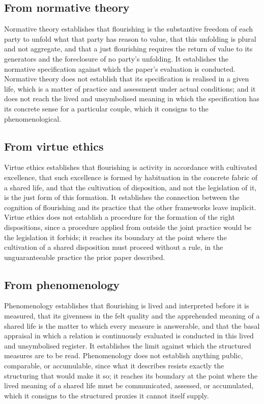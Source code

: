 \subsection{From normative theory}
\label{p11:sec:concl-normative}

Normative theory establishes that flourishing is the substantive freedom of each party to unfold what that party has reason to value, that this unfolding is plural and not aggregate, and that a just flourishing requires the return of value to its generators and the foreclosure of no party's unfolding. It establishes the normative specification against which the paper's evaluation is conducted. Normative theory does not establish that its specification is realised in a given life, which is a matter of practice and assessment under actual conditions; and it does not reach the lived and unsymbolised meaning in which the specification has its concrete sense for a particular couple, which it consigns to the phenomenological.

\subsection{From virtue ethics}
\label{p11:sec:concl-virtue}

Virtue ethics establishes that flourishing is activity in accordance with cultivated excellence, that such excellence is formed by habituation in the concrete fabric of a shared life, and that the cultivation of disposition, and not the legislation of it, is the just form of this formation. It establishes the connection between the cognition of flourishing and its practice that the other frameworks leave implicit. Virtue ethics does not establish a procedure for the formation of the right dispositions, since a procedure applied from outside the joint practice would be the legislation it forbids; it reaches its boundary at the point where the cultivation of a shared disposition must proceed without a rule, in the unguaranteeable practice the prior paper described.

\subsection{From phenomenology}
\label{p11:sec:concl-phenomenology}

Phenomenology establishes that flourishing is lived and interpreted before it is measured, that its givenness in the felt quality and the apprehended meaning of a shared life is the matter to which every measure is answerable, and that the basal appraisal in which a relation is continuously evaluated is conducted in this lived and unsymbolised register. It establishes the limit against which the structured measures are to be read. Phenomenology does not establish anything public, comparable, or accumulable, since what it describes resists exactly the structuring that would make it so; it reaches its boundary at the point where the lived meaning of a shared life must be communicated, assessed, or accumulated, which it consigns to the structured proxies it cannot itself supply.

